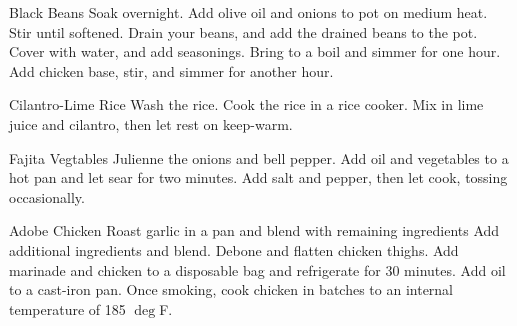 \documentclass[]{article}
\title{}
\author{}
\begin{document}
\RecipeWidths{\textwidth}{3cm}{0.5cm}{4cm}{1cm}{1cm}

\begin{recipe}{Black Beans}{}{}	
	Soak overnight. 
	Add olive oil and onions to pot on medium heat. Stir until softened. 
	Drain your beans, and add the drained beans to the pot. Cover with water, and add seasonings. Bring to a boil and simmer for one hour.
	Add chicken base, stir, and simmer for another hour. 
\end{recipe}

\begin{recipe}{Cilantro-Lime Rice}{}{}	
	Wash the rice. Cook the rice in a rice cooker. 
	Mix in lime juice and cilantro, then let rest on keep-warm. 
\end{recipe}

\begin{recipe}{Fajita Vegtables}{}{}	
	Julienne the onions and bell pepper. Add oil and vegetables to a hot pan and let sear for two minutes. Add salt and pepper, then let cook, tossing occasionally. 
\end{recipe}

\begin{recipe}{Adobe Chicken}{}{}	
	Roast garlic in a pan and blend with remaining ingredients
	Add additional ingredients and blend.
	Debone and flatten chicken thighs. Add marinade and chicken to a disposable bag and refrigerate for 30 minutes. 
	Add oil to a cast-iron pan. Once smoking, cook chicken in batches to an internal temperature of 185 $\deg$F. 
\end{recipe}
\end{document}
